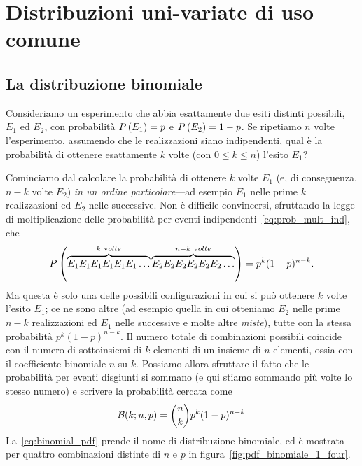 \chapter{Distribuzioni uni-variate di uso comune}

\section{La distribuzione binomiale}
\label{sec:distribuzione_binomiale}

Consideriamo un esperimento che abbia esattamente due esiti distinti possibili,
$E_1$ ed $E_2$, con probabilità $\displaystyle P\left(E_1\right) = p$ e $\displaystyle P\left(E_2\right) = 1 - p$.
Se ripetiamo $n$ volte l'esperimento, assumendo che le realizzazioni siano
indipendenti, qual è la probabilità di ottenere esattamente $k$ volte
(con $0 \leq k \leq n$) l'esito $E_1$?

Cominciamo dal calcolare la probabilità di ottenere $k$ volte $E_1$ (e, di
conseguenza, $n - k$ volte $E_2$) \emph{in un ordine particolare}---ad esempio
$E_1$ nelle prime $k$ realizzazioni ed $E_2$ nelle successive. Non è
difficile convincersi, sfruttando la legge di moltiplicazione delle
probabilità per eventi indipendenti~\eqref{eq:prob_mult_ind}, che
\begin{align*}
  \displaystyle P\left(\overbrace{E_1 E_1 E_1 E_1 E_1 E_1\ldots}^{k~{\mathrm volte}}
    \overbrace{E_2 E_2 E_2 E_2 E_2 E_2\ldots}^{n - k~{\mathrm volte}}\right) =
  p^k (1 - p)^{n - k}.
\end{align*}
Ma questa è solo una delle possibili configurazioni in cui si può ottenere
$k$ volte l'esito $E_1$; ce ne sono altre (ad esempio quella in cui otteniamo
$E_2$ nelle prime $n - k$ realizzazioni ed $E_1$ nelle successive e molte altre
\emph{miste}), tutte con la stessa probabilità $p^k (1 - p)^{n - k}$.
Il numero totale di combinazioni possibili coincide con il numero di
sottoinsiemi di $k$ elementi di un insieme di $n$ elementi, ossia con il
coefficiente binomiale $n$ su $k$. Possiamo allora sfruttare il fatto che le
probabilità per eventi disgiunti si sommano (e qui stiamo sommando più
volte lo stesso numero) e scrivere la probabilità cercata come
\begin{align}\label{eq:binomial_pdf}
  \binomialpdf[n, p]{k} = \binom{n}{k}p^k (1 - p)^{n-k}
\end{align}
La~\eqref{eq:binomial_pdf} prende il nome di distribuzione binomiale, ed è
mostrata per quattro combinazioni distinte di $n$ e $p$ in
figura~\ref{fig:pdf_binomiale_1_four}.

